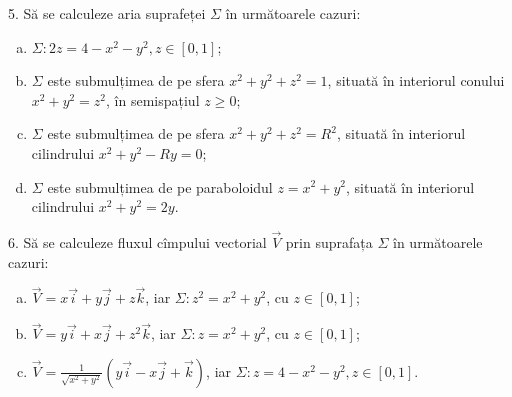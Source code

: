 \documentclass[11pt,a4paper]{article}
\theoremstyle{dotless}
\theoremstyle{dotlessdr}
\begin{document}
\vspace{1cm}

5. Să se calculeze aria suprafeței $\Sigma$ în următoarele cazuri:
\begin{enumerate}[(a)]
\item $\Sigma : 2z = 4 - x^2 - y^2, z \in [0, 1]$;
\item $\Sigma$ este submulțimea de pe sfera $x^2 + y^2 + z^2 = 1$, situată în interiorul
  conului $x^2 + y^2 = z^2$, în semispațiul $z \geq 0$;
\item $\Sigma$ este submulțimea de pe sfera $x^2 + y^2 + z^2 = R^2$, situată în interiorul
  cilindrului $x^2 + y^2 - Ry = 0$;
\item $\Sigma$ este submulțimea de pe paraboloidul $z = x^2 + y^2$, situată în interiorul
  cilindrului $x^2 + y^2 = 2y$.
\end{enumerate}

\vspace{1cm}

6. Să se calculeze fluxul cîmpului vectorial $\vec{V}$ prin suprafața $\Sigma$
în următoarele cazuri:
\begin{enumerate}[(a)]
\item $\vec{V} = x\vec{i} + y\vec{j} + z \vec{k}$, iar $\Sigma: z^2 = x^2 + y^2$,
  cu $z \in [0, 1]$;
\item $\vec{V} = y\vec{i} + x \vec{j} + z^2 \vec{k}$, iar $\Sigma: z = x^2 + y^2$, cu
  $z \in [0, 1]$;
\item $\vec{V} = \frac{1}{\sqrt{x^2 + y^2}} (y\vec{i} - x \vec{j} + \vec{k})$, iar
  $\Sigma: z = 4 - x^2 - y^2, z \in [0, 1]$.
\end{enumerate}
\end{document}

